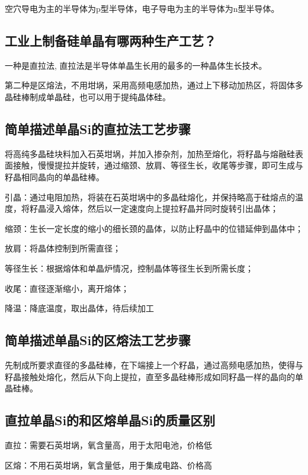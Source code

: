 \documentclass{article}
\begin{document}
空穴导电为主的半导体为p型半导体，电子导电为主的半导体为n型半导体。

\subsection{工业上制备硅单晶有哪两种生产工艺？}

一种是直拉法, 直拉法是半导体单晶生长用的最多的一种晶体生长技术。

第二种是区熔法，不用坩埚，采用高频电感加热，通过上下移动加热区，将固体多晶硅棒制成单晶硅，也可以用于提纯晶体硅。

\subsection{简单描述单晶Si的直拉法工艺步骤}

将高纯多晶硅块料加入石英坩埚，并加入掺杂剂，加热至熔化，将籽晶与熔融硅表面接触，慢慢提拉并旋转，通过缩颈、放肩、等径生长，收尾等步骤，即可生成与籽晶相同晶向的单晶硅棒。

    引晶：通过电阻加热，将装在石英坩埚中的多晶硅熔化，并保持略高于硅熔点的温度，将籽晶浸入熔体，然后以一定速度向上提拉籽晶并同时旋转引出晶体；
    
    缩颈：生长一定长度的缩小的细长颈的晶体，以防止籽晶中的位错延伸到晶体中；
    
    放肩：将晶体控制到所需直径；
    
    等径生长：根据熔体和单晶炉情况，控制晶体等径生长到所需长度；
    
    收尾：直径逐渐缩小，离开熔体；
    
    降温：降底温度，取出晶体，待后续加工
    
\subsection{简单描述单晶Si的区熔法工艺步骤}

先制成所要求直径的多晶硅棒，在下端接上一个籽晶，通过高频电感加热，使得与籽晶接触处熔化，然后从下向上提拉，直至多晶硅棒形成如同籽晶一样的晶向的单晶硅棒。

\subsection{直拉单晶Si的和区熔单晶Si的质量区别}

直拉：需要石英坩埚，氧含量高，用于太阳电池，价格低

区熔：不用石英坩埚，氧含量低，用于集成电路、价格高
\end{document}
